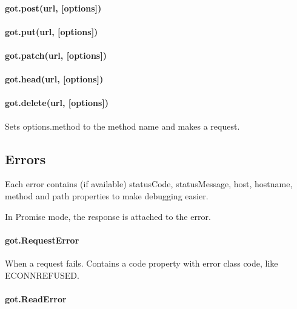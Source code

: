 \paragraph*{got.\+post(url, \mbox{[}options\mbox{]})}

\paragraph*{got.\+put(url, \mbox{[}options\mbox{]})}

\paragraph*{got.\+patch(url, \mbox{[}options\mbox{]})}

\paragraph*{got.\+head(url, \mbox{[}options\mbox{]})}

\paragraph*{got.\+delete(url, \mbox{[}options\mbox{]})}

Sets {\ttfamily options.\+method} to the method name and makes a request.

\subsection*{Errors}

Each error contains (if available) {\ttfamily status\+Code}, {\ttfamily status\+Message}, {\ttfamily host}, {\ttfamily hostname}, {\ttfamily method} and {\ttfamily path} properties to make debugging easier.

In Promise mode, the {\ttfamily response} is attached to the error.

\paragraph*{got.\+Request\+Error}

When a request fails. Contains a {\ttfamily code} property with error class code, like {\ttfamily E\+C\+O\+N\+N\+R\+E\+F\+U\+S\+ED}.

\paragraph*{got.\+Read\+Error}

